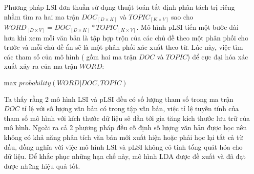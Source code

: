 \documentclass[fontsize=13pt]{scrartcl}
\begin{document}
Phương pháp LSI đơn thuần sử dụng thuật toán tất định phân tách trị riêng nhằm tìm ra hai ma trận $DOC_{[D\times K]}$ và $TOPIC_{[K\times V]}$ sao cho $WORD_{[D\times V]} = DOC_{[D\times K]} * TOPIC_{[K\times V]} $. Mô hình pLSI tiến một bước dài hơn khi xem mỗi văn bản là tập hợp trộn của các chủ đề theo một phân phối cho trước và mỗi chủ đề ẩn sẽ là một phân phối xác xuất theo từ. Lúc này, việc tìm các tham số của mô hình ( gồm hai ma trận $DOC$ và $TOPIC$) để cực đại hóa xác xuất xảy ra của ma trận $WORD$:\\
\begin{center}max $probability(WORD | DOC, TOPIC)$\end{center}
Ta thấy rằng 2 mô hình LSI và pLSI đều có số lượng tham số trong ma trận $DOC$ tỉ lệ với số lượng văn bản có trong tập văn bản, việc tỉ lệ tuyến tính của tham số mô hình với kích thước dữ liệu sẽ dẫn tới gia tăng kích thước lưu trữ của mô hình. Ngoài ra cả 2 phương pháp đều cố định số lượng văn bản được học nên không có khả năng phân tích văn bản mới xuất hiện hoặc phải học lại tất cả từ đầu, đồng nghĩa với việc mô hình LSI và pLSI không có tính tổng quát hóa cho dữ liệu.
Để khắc phục những hạn chế này, mô hình LDA được đề xuất và đã đạt được những hiệu quả tốt.
\end{document}
